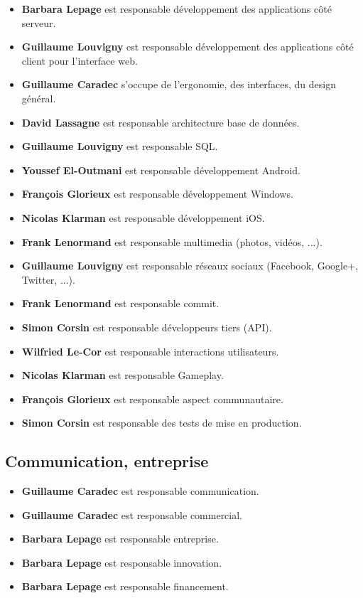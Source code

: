 \documentclass{life-fr}
\begin{document}
\begin{itemize}
  \item \textbf{Barbara Lepage} est responsable développement des applications côté
    serveur.
  \item \textbf{Guillaume Louvigny} est responsable développement des
    applications côté client pour l'interface web.
  \item \textbf{Guillaume Caradec} s'occupe de l'ergonomie, des interfaces, du
    design général.
  \item \textbf{David Lassagne} est responsable architecture base de données.
  \item \textbf{Guillaume Louvigny} est responsable SQL.
  \item \textbf{Youssef El-Outmani} est responsable développement Android.
  \item \textbf{François Glorieux} est responsable développement Windows.
  \item \textbf{Nicolas Klarman} est responsable développement iOS.
  \item \textbf{Frank Lenormand} est responsable multimedia (photos, vidéos, ...).
  \item \textbf{Guillaume Louvigny} est responsable réseaux sociaux (Facebook,
    Google+, Twitter, ...).
  \item \textbf{Frank Lenormand} est responsable commit.
  \item \textbf{Simon Corsin} est responsable développeurs tiers (API).
  \item \textbf{Wilfried Le-Cor} est responsable interactions utilisateurs.
  \item \textbf{Nicolas Klarman} est responsable Gameplay.
  \item \textbf{François Glorieux} est responsable aspect communautaire.
  \item \textbf{Simon Corsin} est responsable des tests de mise en production.
\end{itemize}

\subsection{ Communication, entreprise}

\begin{itemize}
  \item \textbf{Guillaume Caradec} est responsable communication.
  \item \textbf{Guillaume Caradec} est responsable commercial.
  \item \textbf{Barbara Lepage} est responsable entreprise.
  \item \textbf{Barbara Lepage} est responsable innovation.
  \item \textbf{Barbara Lepage} est responsable financement.
\end{itemize}
\end{document}
